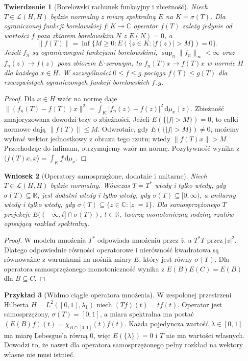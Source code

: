 \documentclass[11pt,a4paper]{article}
\numberwithin{equation}{section}
\theoremstyle{plain}
\newtheorem{twierdzenie}{Twierdzenie}[section]
\newtheorem{wniosek}[twierdzenie]{Wniosek}
\theoremstyle{definition}
\newtheorem{przyklad}[twierdzenie]{Przykład}
\theoremstyle{remark}
\newcommand{\R}{\mathbb R}
\newcommand{\C}{\mathbb C}
\begin{document}
\begin{twierdzenie}[Borelowski rachunek funkcyjny i zbieżność]
\label{thm:borel-convergence32}
Niech $T\in\mathcal L(H,H)$ będzie normalny z miarą spektralną $E$
na $K=\sigma(T)$. Dla ograniczonej funkcji borelowskiej
$f:K\to\C$ operator $f(T)$ zależy jedynie od wartości $f$
poza zbiorem borelowskim $N$ z $E(N)=0$, a
\[
 \|f(T)\|=\inf\{M\ge0:E(\{z\in K:|f(z)|>M\})=0\}.
\]
Jeżeli $f_n$ są ograniczonymi funkcjami borelowskimi,
$\sup_n\|f_n\|_\infty<\infty$ oraz $f_n(z)\to f(z)$
poza zbiorem $E$-zerowym, to $f_n(T)x\to f(T)x$
w normie $H$ dla każdego $x\in H$.
W szczególności $0\le f\le g$ pociąga $f(T)\le g(T)$
dla rzeczywistych ograniczonych funkcji borelowskich $f,g$.
\end{twierdzenie}
\begin{proof}
Dla $x\in H$ wzór na normę daje
$\|(f_n(T)-f(T))x\|^2
=\int_K|f_n(z)-f(z)|^2\,\mathrm d\mu_x(z)$.
Zbieżność zmajoryzowana dowodzi tezy o zbieżności.
Jeżeli $E(\{|f|>M\})=0$, to całki normowe dają
$\|f(T)\|\le M$. Odwrotnie, gdy $E(\{|f|>M\})\ne0$,
możemy wybrać wektor jednostkowy z obrazu tego rzutu;
wtedy $\|f(T)x\|>M$. Przechodząc do infimum,
otrzymujemy wzór na normę.
Pozytywność wynika z
$\langle f(T)x,x\rangle=\int_Kf\,\mathrm d\mu_x$.
\end{proof}

\begin{wniosek}[Operatory samosprzężone, dodatnie i unitarne]
\label{cor:spectral-types32}
Niech $T\in\mathcal L(H,H)$ będzie normalny.
Wówczas $T=T^*$ wtedy i tylko wtedy, gdy
$\sigma(T)\subseteq\R$; jest dodatni wtedy i tylko wtedy, gdy
$\sigma(T)\subseteq[0,\infty)$, a unitarny wtedy i tylko wtedy,
gdy $\sigma(T)\subseteq\{z\in\C:|z|=1\}$.
Dla samosprzężonego $T$ projekcje
$E(( -\infty,t]\cap\sigma(T))$, $t\in\R$, tworzą
monotoniczną rodzinę rzutów opisującą rozkład spektralny.
\end{wniosek}
\begin{proof}
W modelu mnożenia $T^*$ odpowiada mnożeniu przez
$\overline z$, a $T^*T$ przez $|z|^2$. Dlatego odpowiednie
równości operatorowe i nierówność kwadratowa są równoważne
z warunkami na nośnik miary $E$, który jest równy $\sigma(T)$.
Dla operatora samosprzężonego monotoniczność wynika z
$E(B)E(C)=E(B)$ dla $B\subseteq C$.
\end{proof}

\begin{przyklad}[Widmo ciągłe operatora mnożenia]
\label{ex:mult-spectrum32}
W zespolonej przestrzeni Hilberta $H=L^2([0,1],\lambda_1)$
niech $(Tf)(t)=tf(t)$. Operator jest samosprzężony,
$\sigma(T)=[0,1]$, a miara spektralna ma postać
$(E(B)f)(t)=\chi_{B\cap[0,1]}(t)f(t)$.
Każda pojedyncza wartość $\lambda\in[0,1]$ ma miarę Lebesgue'a
równą $0$, więc $E(\{\lambda\})=0$ i $T$ nie ma wartości
własnych. Dowodzi to, że nawet dla operatora samosprzężonego
pełny rozkład na wektory własne nie musi istnieć.
\end{przyklad}
\end{document}
